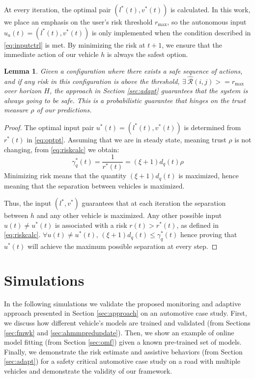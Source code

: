 \documentclass[letterpaper, 10 pt, conference]{ieeeconf}  %
\newtheorem{lemma}{Lemma}
\begin{document}
At every iteration, the optimal pair $(l^*(t),v^*(t))$ is calculated. In this work, we place an emphasis on the user's risk threshold $r_{\max}$, so the autonomous input $u_a(t) = (l^*(t),v^*(t))$ is only implemented when the condition described in \eqref{eq:inputctrl} is met. By minimizing the risk at $t+1$, we ensure that the immediate action of our vehicle $h$ is always the safest option.

\begin{lemma}
Given a configuration where there exists a safe sequence of actions, and if any risk in this configuration is above the threshold, $ \exists~\hat{\mathcal{R}}(i,j) >= r_{\max}$ over horizon $H$, the approach in Section \ref{sec:adapt} guarantees that the system is always going to be safe. This is a probabilistic guarantee that hinges on the trust measure $\rho$ of our predictions.

\end{lemma}

\begin{proof}
The optimal input pair $u^*(t)=(l^*(t),v^*(t))$ is determined from $r^*(t)$ in \eqref{eq:optpt}.
Assuming that we are in steady state, meaning trust $\rho$ is not changing, from \eqref{eq:riskcalc} we obtain:
\begin{equation}
\gamma_q^*(t) = \frac{1}{r^*(t)}=(\xi+1) d_q(t) \rho
\end{equation}
Minimizing risk means that the quantity $(\xi+1)d_q(t)$ is maximized, hence meaning that the separation between vehicles is maximized.

Thus, the input $(l^*,v^*)$ guarantees that at each iteration the separation between $h$ and any other vehicle is maximized. Any other possible input $u(t) \neq u^*(t)$ is associated with a risk $r(t)>r^*(t)$, as defined in \eqref{eq:riskcalc}. $\forall u(t) \neq u^*(t)$, $(\xi+1)d_q(t)\leq\gamma_q^*(t)$ hence proving that $u^*(t)$ will achieve the maximum possible separation at every step.

\end{proof}

\section{Simulations} \label{sec:sims}
In the following simulations we validate the proposed monitoring and adaptive approach presented in Section \ref{sec:approach} on an automotive case study. First, we discuss how different vehicle's models are trained and validated (from Sections \ref{sec:fmwk} and \ref{sec:ahmmpredupdate}). Then, we show an example of online model fitting (from Section \ref{sec:omf}) given a known pre-trained set of models. Finally, we demonstrate the risk estimate and assistive behaviors (from Section \ref{sec:adapt}) for a safety critical automotive case study on a road with multiple vehicles and demonstrate the validity of our framework.
\end{document}
